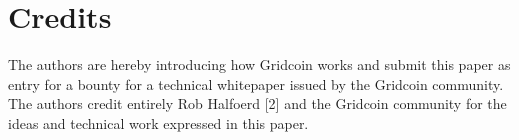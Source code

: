 \documentclass[10pt,a4paper]{article}
\begin{document}
\section{Credits}
\label{sec:credits}

The authors are hereby introducing how Gridcoin works and submit this paper as entry for a bounty for a technical whitepaper issued by the Gridcoin community. The authors credit entirely Rob Halfoerd [2] and the Gridcoin community for the ideas and technical work expressed in this paper.

















\newpage


\end{document}
